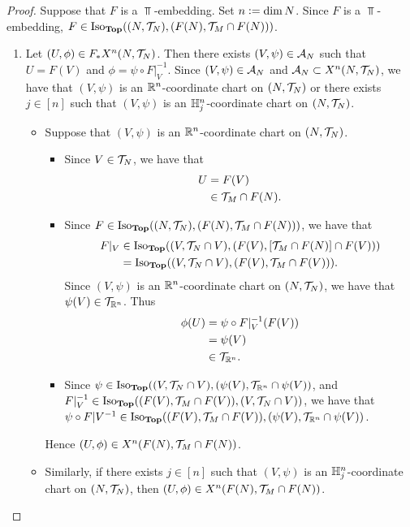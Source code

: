 \documentclass{book}
\begin{document}
\begin{proof}
	Suppose that $F$ is a $\Top$-embedding. Set $n \vcentcolon= \dim N$. Since $F$ is a $\Top$-embedding, $F \in \operatorname{Iso}_{\operatorname*{\text{\textbf{Top}}}}((N, \mathcal{T}_N), (F(N), \mathcal{T}_M \cap F(N)))$.
	\begin{enumerate}
		\item Let $(U, \phi) \in F_*X^n(N, \mathcal{T}_N)$. Then there exists $(V, \psi) \in \mathcal{A}_N$ such that $U = F(V)$ and $\phi = \psi \circ F|_V^{-1}$. Since $(V, \psi) \in \mathcal{A}_N$ and $\mathcal{A}_N \subset X^n(N, \mathcal{T}_N)$, we have that $(V, \psi)$ is an $\mathbb{R}^n$-coordinate chart on $(N, \mathcal{T}_N)$ or there exists $j \in [n]$ such that $(V, \psi)$ is an $\mathbb{H}^n_j$-coordinate chart on $(N, \mathcal{T}_N)$. 
		\begin{itemize}
			\item Suppose that $(V, \psi)$ is an $\mathbb{R}^n$-coordinate chart on $(N, \mathcal{T}_N)$. 
			\begin{itemize}
				\item Since $V \in \mathcal{T}_N$, we have that 
				\begin{align*}
					U
					& = F(V) \\
					& \in \mathcal{T}_M \cap F(N).
				\end{align*}
				\item Since $F \in \operatorname{Iso}_{\operatorname*{\text{\textbf{Top}}}}((N, \mathcal{T}_N), (F(N), \mathcal{T}_M \cap F(N)))$, we have that 
				\begin{align*}
					F|_V 
					& \in \operatorname{Iso}_{\operatorname*{\text{\textbf{Top}}}}((V, \mathcal{T}_N \cap V), (F(V), [\mathcal{T}_M \cap F(N)] \cap F(V))) \\
					& = \operatorname{Iso}_{\operatorname*{\text{\textbf{Top}}}}((V, \mathcal{T}_N \cap V), (F(V), \mathcal{T}_M \cap F(V))).
				\end{align*}
				Since $(V, \psi)$ is an $\mathbb{R}^n$-coordinate chart on $(N, \mathcal{T}_N)$, we have that $\psi(V) \in \mathcal{T}_{\mathbb{R}^n}$. Thus 
				\begin{align*}
					\phi(U)
					& = \psi \circ F|_V^{-1}( F(V)) \\
					& = \psi(V) \\
					& \in \mathcal{T}_{\mathbb{R}^n}.
				\end{align*}
				\item Since $\psi \in \operatorname{Iso}_{\operatorname*{\text{\textbf{Top}}}}((V, \mathcal{T}_N \cap V), (\psi(V), \mathcal{T}_{\mathbb{R}^n} \cap \psi(V))$, and $F|_V^{-1} \in \operatorname{Iso}_{\operatorname*{\text{\textbf{Top}}}}((F(V), \mathcal{T}_M \cap F(V)), (V, \mathcal{T}_N \cap V))$, we have that $\psi \circ F|V^{-1} \in \operatorname{Iso}_{\operatorname*{\text{\textbf{Top}}}}((F(V), \mathcal{T}_M \cap F(V)), (\psi(V), \mathcal{T}_{\mathbb{R}^n} \cap \psi(V))$. 
			\end{itemize}
			Hence $(U, \phi) \in X^n(F(N), \mathcal{T}_M \cap F(N))$.
			\item Similarly, if there exists $j \in [n]$ such that $(V, \psi)$ is an $\mathbb{H}^n_j$-coordinate chart on $(N, \mathcal{T}_N)$, then $(U, \phi) \in X^n(F(N), \mathcal{T}_M \cap F(N))$.

\end{itemize}
\end{enumerate}
\end{proof}
\end{document}
